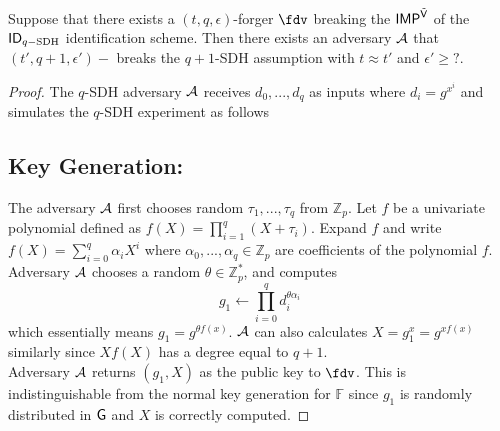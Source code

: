 \begin{theorem}
Suppose that there exists a $(t, q, \epsilon)$-forger $\fdv$ breaking the $\mathsf{IMP}^{\tilde{\mathsf{V}}}$ of the $\mathsf{ID}_{q-\text{SDH}}$ identification scheme. Then there exists an adversary $\mathcal{A}$ that $(t',q+1,\epsilon')-$ breaks the $q+1$-SDH assumption with $t \approx t'$ and 
$\epsilon' \geq ?.$
\end{theorem}
\begin{proof}
The $q$-SDH adversary $\mathcal{A}$ receives $d_0,...,d_q$ as inputs where $d_i = g^{x^i}$ and simulates the $q$-SDH experiment as follows
\subsection*{Key Generation:} The adversary $\mathcal{A}$ first chooses random $\tau_1,...,\tau_q$ from $\mathbb{Z}_p$. Let $f$ be a univariate polynomial defined as 
$f(X) = \prod_{i=1}^q (X+\tau_i)$. Expand $f$ and write $f(X) = \sum_{i=0}^q \alpha_i X^i$ where
$\alpha_0,...,\alpha_q \in \mathbb{Z}_p$ are coefficients of the polynomial $f$. Adversary $\mathcal{A}$ chooses a random $\theta \in \mathbb{Z}^*_p$, and computes
$$g_1 \leftarrow \prod_{i=0}^q d_i^{\theta\alpha_i}$$
which essentially means $g_1 = g^{\theta f(x)}$. $\mathcal{A}$ can also calculates 
$X = g_1^x = g^{xf(x)}$ similarly since $Xf(X)$ has a degree equal to $q+1$.
\\
Adversary $\mathcal{A}$ returns $(g_1,X)$ as the public key to $\fdv$. This is indistinguishable from the normal key generation for $\mathbb{F}$ since $g_1$ is randomly distributed in $\mathsf{G}$ and $X$ is correctly computed.
\end{proof}
